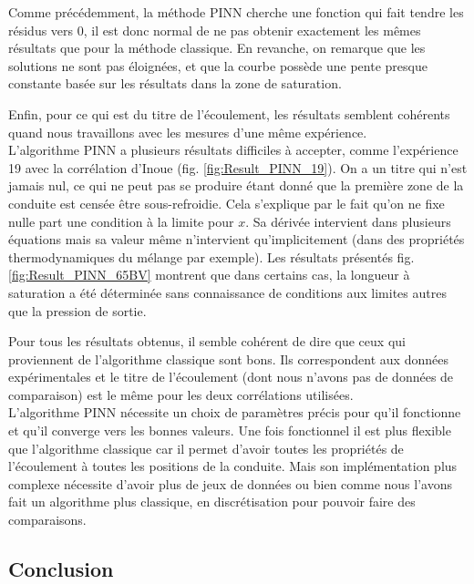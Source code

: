 Comme précédemment, la méthode PINN cherche une fonction qui fait tendre les résidus vers 0, il est donc normal de ne pas obtenir exactement les mêmes résultats que pour la méthode classique. En revanche, on remarque que les solutions ne sont pas éloignées, et que la courbe possède une pente presque constante basée sur les résultats dans la zone de saturation.\\ \par
Enfin, pour ce qui est du titre de l'écoulement, les résultats semblent cohérents quand nous travaillons avec les mesures d'une même expérience. \\

L'algorithme PINN a plusieurs résultats difficiles à accepter, comme l'expérience 19 avec la corrélation d'Inoue (fig. \ref{fig:Result_PINN_19}). On a un titre qui n'est jamais nul, ce qui ne peut pas se produire étant donné que la première zone de la conduite est censée être sous-refroidie. Cela s'explique par le fait qu'on ne fixe nulle part  une condition à la limite pour $x$. Sa dérivée intervient dans plusieurs équations mais sa valeur même n'intervient qu'implicitement (dans des propriétés thermodynamiques du mélange par exemple). Les résultats présentés fig. \ref{fig:Result_PINN_65BV} montrent que dans certains cas, la longueur à saturation a été déterminée sans connaissance de conditions aux limites autres que la pression de sortie.\\ \par

Pour tous les résultats obtenus, il semble cohérent de dire que ceux qui proviennent de l'algorithme classique sont bons. Ils correspondent aux données expérimentales et le titre de l'écoulement (dont nous n'avons pas de données de comparaison) est le même pour les deux corrélations utilisées.\\

L'algorithme PINN nécessite un choix de paramètres précis pour qu'il fonctionne et qu'il converge vers les bonnes valeurs. Une fois fonctionnel il est plus flexible que l'algorithme classique car il permet d'avoir toutes les propriétés de l'écoulement à toutes les positions de la conduite. Mais son implémentation plus complexe nécessite d'avoir plus de jeux de données ou bien comme nous l'avons fait un algorithme plus classique, en discrétisation pour pouvoir faire des comparaisons.

\subsection{Conclusion}

